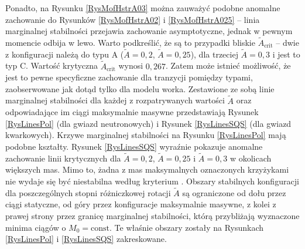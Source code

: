 \documentclass{bachelor_thesis}
\begin{document}
            \indent Ponadto, na Rysunku \ref{RysMofHstrA03} można zauważyć podobne anomalne zachowanie do Rysunków \ref{RysMofHstrA02} i \ref{RysMofHstrA025} -- linia marginalnej stabilności przejawia zachowanie asymptotyczne, jednak w pewnym momencie odbija w lewo. Warto podkreślić, że są to przypadki bliskie $\tilde{A}_\textrm{crit}$ -- dwie z konfiguracji należą do typu A ($\tilde{A}=0,2$, $\tilde{A}=0,25$), dla trzeciej $\tilde{A}=0,3$ i jest to typ C. Wartość krytyczna $\tilde{A}_\textrm{crit}$ wynosi $0,267$. Zatem może istnieć możliwość, że jest to pewne specyficzne zachowanie dla tranzycji pomiędzy typami, zaobserwowane jak dotąd tylko dla modelu worka. Zestawione ze sobą linie marginalnej stabilności dla każdej z rozpatrywanych wartości $\tilde{A}$ oraz odpowiadające im ciągi maksymalnie masywne przedstawiają Rysunek \ref{RysLinesPol} (dla gwiazd neutronowych) i Rysunek \ref{RysLinesSQS} (dla gwiazd kwarkowych). Krzywe marginalnej stabilności na Rysunku \ref{RysLinesPol} mają podobne kształty. Rysunek \ref{RysLinesSQS} wyraźnie pokazuje anomalne zachowanie linii krytycznych dla $\tilde{A}=0,2$, $\tilde{A}=0,25$ i $\tilde{A}=0,3$ w okolicach większych mas. Mimo to, żadna z mas maksymalnych oznaczonych krzyżykami nie wydaje się być niestabilna według kryterium \cite{Friedman1988}. Obszary stabilnych konfiguracji dla poszczególnych stopni różniczkowej rotacji $\tilde{A}$ są ograniczone od dołu przez ciągi statyczne, od góry przez konfiguracje maksymalnie masywne, z kolei z prawej strony przez granicę marginalnej stabilności, którą przybliżają wyznaczone minima ciągów o $M_0=\textrm{const}$. Te właśnie obszary zostały na Rysunkach \ref{RysLinesPol} i \ref{RysLinesSQS} zakreskowane.
\end{document}
